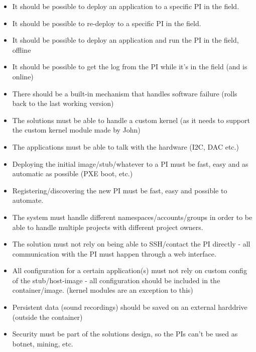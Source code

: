 \documentclass[../../main.tex]{subfiles}
\begin{document}
\begin{itemize}
	\item It should be possible to deploy an application to a specific PI in the field.
	\item It should be possible to re-deploy to a specific PI in the field.
	\item It should be possible to deploy an application and run the PI in the field, offline
	\item It should be possible to get the log from the PI while it’s in the field (and is online)
	\item There should be a built-in mechanism that handles software failure (rolls back to the last working version)
	\item The solutions must be able to handle a custom kernel (as it needs to support the custom kernel module made by John)
	\item The applications must be able to talk with the hardware (I2C, DAC etc.)
	\item Deploying the initial image/stub/whatever to a PI must be fast, easy and as automatic as possible (PXE boot, etc.)
	\item Registering/discovering the new PI must be fast, easy and possible to automate.
	\item The system must handle different namespaces/accounts/groups in order to be able to handle multiple projects with different project owners.
	\item The solution must not rely on being able to SSH/contact the PI directly - all communication with the PI must happen through a web interface.
	\item All configuration for a certain application(s) must not rely on custom config of the stub/host-image - all configuration should be included in the container/image. (kernel modules are an exception to this)
	\item Persistent data (sound recordings) should be saved on an external harddrive (outside the container)
	\item Security must be part of the solutions design, so the PIs can’t be used as botnet, mining, etc.
\end{itemize}
\end{document}
